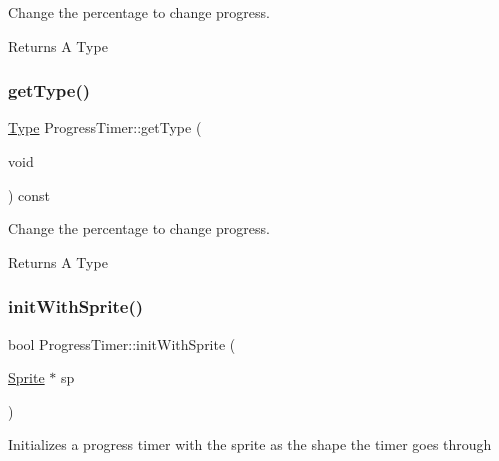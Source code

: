 Change the percentage to change progress.

\begin{DoxyReturn}{Returns}
A Type 
\end{DoxyReturn}
\mbox{\label{classProgressTimer_a322177b2b80d358482270730ba811cbd}} 
\subsubsection{\texorpdfstring{get\+Type()}{getType()}\hspace{0.1cm}{\footnotesize\ttfamily [2/2]}}
{\footnotesize\ttfamily \hyperlink{classProgressTimer_a9638d092b86d51bce727621b1a70d32f}{Type} Progress\+Timer\+::get\+Type (\begin{DoxyParamCaption}\item[{void}]{ }\end{DoxyParamCaption}) const\hspace{0.3cm}{\ttfamily [inline]}}

Change the percentage to change progress.

\begin{DoxyReturn}{Returns}
A Type 
\end{DoxyReturn}
\mbox{\label{classProgressTimer_afa1640086b67814db77d3ae725c18b45}} 
\subsubsection{\texorpdfstring{init\+With\+Sprite()}{initWithSprite()}\hspace{0.1cm}{\footnotesize\ttfamily [1/2]}}
{\footnotesize\ttfamily bool Progress\+Timer\+::init\+With\+Sprite (\begin{DoxyParamCaption}\item[{\hyperlink{classSprite}{Sprite} $\ast$}]{sp }\end{DoxyParamCaption})}

Initializes a progress timer with the sprite as the shape the timer goes through \mbox{\label{classProgressTimer_afa1640086b67814db77d3ae725c18b45}} 
